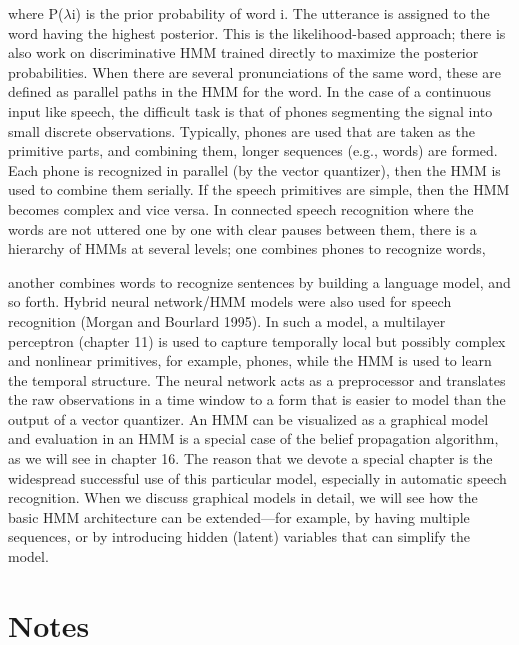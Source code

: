 where P($\lambda$i) is the prior probability of word i. The utterance is assigned to the word having the highest posterior. This is the likelihood-based approach; there is also work on discriminative HMM trained directly to maximize the posterior probabilities. When there are several pronunciations of the same word, these are defined as parallel paths in the HMM for the word. In the case of a continuous input like speech, the difficult task is that of phones segmenting the signal into small discrete observations. Typically, phones are used that are taken as the primitive parts, and combining them, longer sequences (e.g., words) are formed. Each phone is recognized in parallel (by the vector quantizer), then the HMM is used to combine them serially. If the speech primitives are simple, then the HMM becomes complex and vice versa. In connected speech recognition where the words are not uttered one by one with clear pauses between them, there is a hierarchy of HMMs at several levels; one combines phones to recognize words,

another combines words to recognize sentences by building a language model, and so forth. Hybrid neural network/HMM models were also used for speech recognition (Morgan and Bourlard 1995). In such a model, a multilayer perceptron (chapter 11) is used to capture temporally local but possibly complex and nonlinear primitives, for example, phones, while the HMM is used to learn the temporal structure. The neural network acts as a preprocessor and translates the raw observations in a time window to a form that is easier to model than the output of a vector quantizer. An HMM can be visualized as a graphical model and evaluation in an HMM is a special case of the belief propagation algorithm, as we will see in chapter 16. The reason that we devote a special chapter is the widespread successful use of this particular model, especially in automatic speech recognition. When we discuss graphical models in detail, we will see how the basic HMM architecture can be extended---for example, by having multiple sequences, or by introducing hidden (latent) variables that can simplify the model.

\section{Notes}

